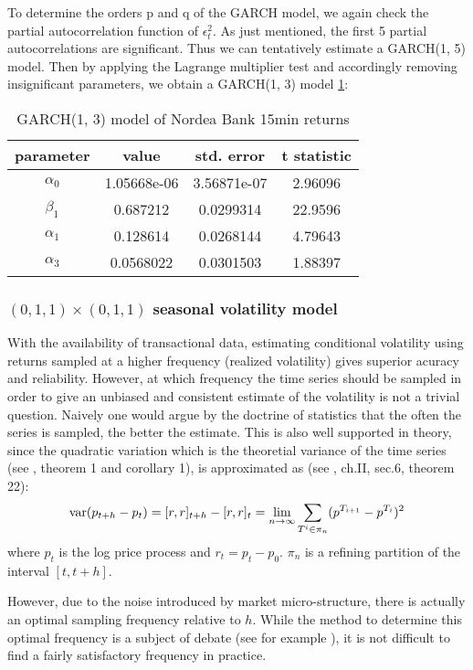 \documentclass{book}
\begin{document}
To determine the orders p and q of the GARCH model, we again check
the partial autocorrelation function of $\epsilon_t^2$. As just
mentioned, the first 5 partial autocorrelations are significant. Thus
we can tentatively estimate a GARCH(1, 5) model. Then by applying the
Lagrange multiplier test and accordingly removing insignificant
parameters, we obtain a GARCH(1, 3) model
\ref{tab:nordea_15min_garch}:
\begin{table}[htb!]
  \centering
  \begin{tabular}{c|c|c|c}
    parameter & value & std. error & t statistic \\
    \hline
     $\alpha_0$ &   1.05668e-06 &   3.56871e-07 &    2.96096\\
     \hline
     $\beta_1$  &     0.687212  &   0.0299314   &    22.9596\\
     \hline
     $\alpha_1$ &      0.128614 &   0.0268144   &    4.79643\\
     \hline
     $\alpha_3$ &    0.0568022  &   0.0301503   &    1.88397
  \end{tabular}
  \caption{GARCH(1, 3) model of Nordea Bank 15min returns}
  \label{tab:nordea_15min_garch}
\end{table}

\subsubsection{$(0,1,1)\times(0, 1, 1)$ seasonal volatility model}
With the availability of transactional data, estimating conditional
volatility using returns sampled at a higher frequency (realized
volatility) gives superior acuracy and reliability. However, at which
frequency the time series should be sampled in order to give an
unbiased and consistent estimate of the volatility is not a trivial
question. Naively one would argue by the doctrine of statistics that
the often the series is sampled, the better the estimate. This is also
well supported in theory, since the quadratic variation which is the
theoretial variance of the time series (see \cite{Andersen03}, theorem
1 and corollary 1), is approximated as (see \cite{Protter05}, ch.II,
sec.6, theorem 22):
\[
\text{var}(p_{t+h} - p_t) = [r, r]_{t+h} - [r, r]_t = \lim_{n \to \infty}
\sum_{T^i \in \pi_n} (p^{T_{i+1}} - p^{T_i})^2
\]
where $p_t$ is the log price process and $r_t = p_t - p_0$. $\pi_n$
is a refining partition of the interval $[t, t+h]$.

However, due to the noise introduced by market micro-structure, there
is actually an optimal sampling frequency relative to $h$. While the
method to determine this optimal frequency is a subject of debate (see
for example \cite{Sahalia05}), it is not difficult to find a fairly
satisfactory frequency in practice.
\end{document}
